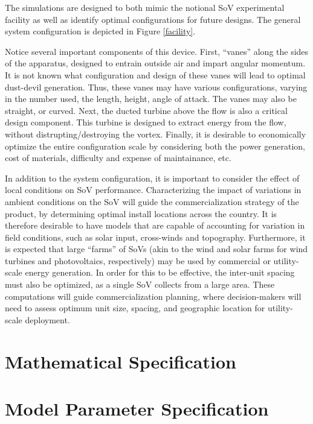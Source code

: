\documentclass{article}
\begin{document}
The simulations are designed to both mimic the notional SoV experimental
facility as well as identify optimal configurations for future
designs. The general system configuration is depicted in Figure
\ref{facility}. 

Notice several important components of this device. First, ``vanes''
along the sides of the apparatus, designed to entrain outside air and
impart angular momentum. It is not known what configuration and design
of these vanes will lead to optimal dust-devil generation. Thus, these
vanes may have various configurations, varying in the number used, the
length, height, angle of attack. The vanes may also be straight, or
curved.  Next, the ducted turbine above the flow is also a critical design
component. This turbine is designed to extract energy from the flow,
without distrupting/destroying the vortex. Finally, it is desirable to
economically optimize the entire configuration scale by considering both
the power generation, cost of materials, difficulty and expense of
maintainance, etc. 

In addition to the system configuration, it is important to consider the
effect of local conditions on SoV performance. Characterizing the impact
of variations in ambient conditions on the SoV will guide the
commercialization strategy of the product, by determining optimal
install locations across the country. It is therefore desirable to have models
that are capable of accounting for variation in field conditions, such as solar
input, cross-winds and topography. Furthermore, it is expected that 
large ``farms'' of SoVs (akin to the wind and solar farms for wind turbines
and photovoltaics, respectively) may be used by commercial or
utility-scale energy generation. In order for this to be effective, 
the inter-unit spacing must also be optimized, as a single SoV collects
from a large area. These computations will guide commercialization
planning, where decision-makers will need to assess optimum unit size,
spacing, and geographic location for utility-scale deployment.  

%
%
%
\section{Mathematical Specification}


%
%
%
\section{Model Parameter Specification}
\end{document}
